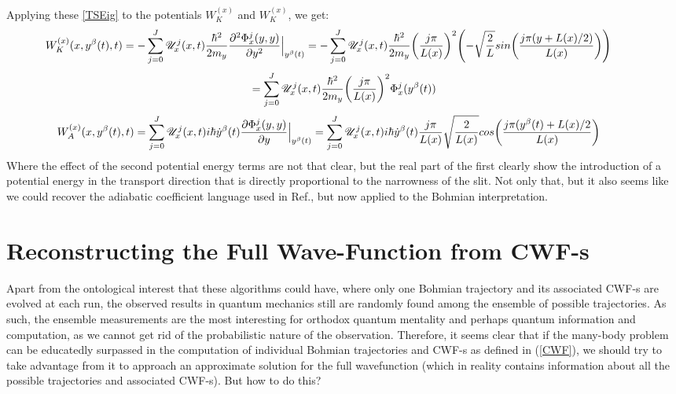 \documentclass[11pt, a4paper]{article} %
\newcommand{\U}{\mathscr{U}}
\begin{document}
Applying these \ref{TSEig} to the potentials $W_K^{(x)}$ and $W_K^{(x)}$, we get:
$$
\hspace{-1cm} W_K^{(x)}(x,y^\beta(t),t)= -\sum_{j=0}^J \U^j_x(x,t)\frac{\hbar^2}{2m_y}\pdv[2]{\Phi^j_x(y,y)}{y}\Big\rvert_{y^\beta(t)} = -\sum_{j=0}^J \U^j_x(x,t)\frac{\hbar^2}{2m_y}\qty(\frac{j\pi}{L(x)})^2\qty(- \sqrt{\frac{2}{L}} sin\qty( \frac{j\pi (y+L(x)/2)}{L(x)} ))
$$
$$
=\sum_{j=0}^J  \U^j_x(x,t)\frac{\hbar^2}{2m_y}\qty(\frac{j\pi}{L(x)})^2 \Phi^j_x(y^\beta(t))
$$
$$
\hspace{-1cm} W_A^{(x)}(x,y^\beta(t),t)=\sum_{j=0}^J \U^j_x(x,t)i\hbar\dot{y}^\beta(t)\pdv{\Phi^j_x(y,y)}{y}\Big\rvert_{y^\beta(t)}= \sum_{j=0}^J \U^j_x(x,t)i\hbar\dot{y}^\beta(t) \frac{j\pi}{L(x)} \sqrt{\frac{2}{L(x)}}cos\qty(\frac{j\pi (y^\beta(t)+L(x)/2}{L(x)})
$$
Where the effect of the second potential energy terms are not that clear, but the real part of the first clearly show the introduction of a potential energy in the transport direction that is directly proportional to the narrowness of the slit. Not only that, but it also seems like we could recover the adiabatic coefficient language used in Ref.\cite{Dev}, but now applied to the Bohmian interpretation.

\newpage
\section{Reconstructing the Full Wave-Function from CWF-s}
Apart from the ontological interest that these algorithms could have, where only one Bohmian trajectory and its associated CWF-s are evolved at each run, the observed results in quantum mechanics still are randomly found among the ensemble of possible trajectories. As such, the ensemble measurements are the most interesting for orthodox quantum mentality and perhaps quantum information and computation, as we cannot get rid of the probabilistic nature of the observation. Therefore, it seems clear that if the many-body problem can be educatedly surpassed in the computation of individual Bohmian trajectories and CWF-s as defined in (\ref{CWF}), we should try to take advantage from it to approach an approximate solution for the full wavefunction (which in reality contains information about all the possible trajectories and associated CWF-s). But how to do this?
\end{document}
